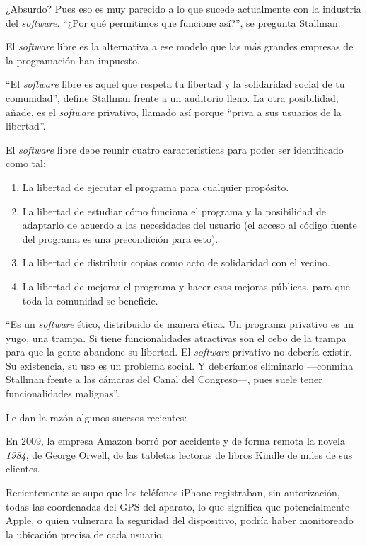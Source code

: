 \documentclass[oneside,twocolumn]{article}
\begin{document}
¿Absurdo? Pues eso es muy parecido a lo que sucede actualmente con la industria del \emph{software}. 
``¿Por qué permitimos que funcione así?'', se pregunta Stallman.

El \emph{software} libre es la alternativa a ese modelo que las más grandes empresas de la 
programación han impuesto.

``El \emph{software} libre es aquel que respeta tu libertad y la solidaridad social de tu comunidad'', 
define Stallman frente a un auditorio lleno. La otra posibilidad, añade, es el \emph{software} privativo, 
llamado así porque ``priva a sus usuarios de la libertad''.

El \emph{software} libre debe reunir cuatro características para poder ser identificado como tal:

\begin{enumerate}
\item La libertad de ejecutar el programa para cualquier propósito.
\item La libertad de estudiar cómo funciona el programa y la posibilidad de adaptarlo de acuerdo a las 
necesidades del usuario (el acceso al código fuente del programa es una precondición para esto).
\item La libertad de distribuir copias como acto de solidaridad con el vecino.
\item La libertad de mejorar el programa y hacer esas mejoras públicas, para que toda la comunidad se
beneficie.
\end{enumerate}

``Es un \emph{software} ético, distribuido de manera ética. Un programa privativo es un yugo, 
una trampa. Si tiene funcionalidades atractivas son el cebo de la trampa para que la gente abandone 
su libertad. El \emph{software} privativo no debería existir. Su existencia, su uso es un problema 
social. Y deberíamos eliminarlo ---conmina Stallman frente a las cámaras del Canal del Congreso---, pues suele tener 
funcionalidades malignas''.

Le dan la razón algunos sucesos recientes:

En 2009, la empresa Amazon borró por accidente y de forma remota la novela \emph{1984}, de George Orwell, 
de las tabletas lectoras de libros Kindle de miles de sus clientes.

Recientemente se supo que los teléfonos iPhone registraban, sin autorización, todas las coordenadas 
del GPS del aparato, lo que significa que potencialmente Apple, o quien vulnerara la seguridad del 
dispositivo, podría haber monitoreado la ubicación precisa de cada usuario.
\end{document}
